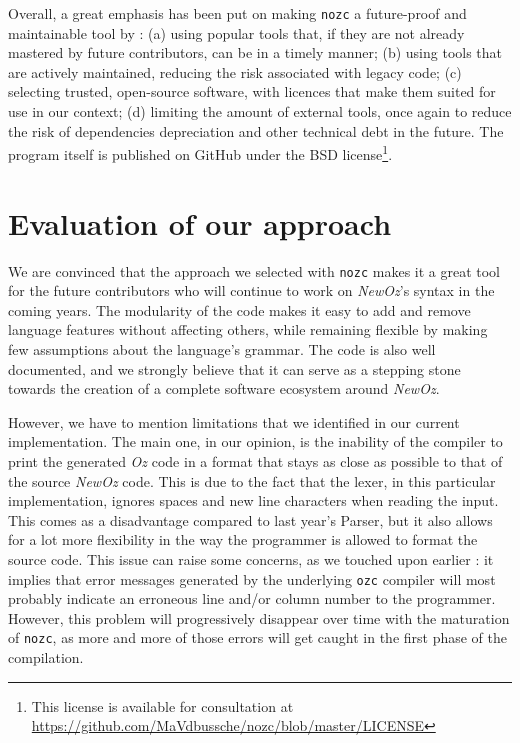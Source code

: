 Overall, a great emphasis has been put on making \texttt{nozc} a future-proof and maintainable tool by : (a) using popular tools that, if they are not already mastered by future contributors, can be in a timely manner; (b) using tools that are actively maintained, reducing the risk associated with legacy code; (c) selecting trusted, open-source software, with licences that make them suited for use in our context; (d) limiting the amount of external tools, once again to reduce the risk of dependencies depreciation and other technical debt in the future.\newline
The program itself is published on GitHub under the BSD license\footnote{This license is available for consultation at \url{https://github.com/MaVdbussche/nozc/blob/master/LICENSE}}.

\section{Evaluation of our approach}\label{sec:ch3-pros-cons}
We are convinced that the approach we selected with \texttt{nozc} makes it a great tool for the future contributors who will continue to work on \textit{NewOz}'s syntax in the coming years.
The modularity of the code makes it easy to add and remove language features without affecting others, while remaining flexible by making few assumptions about the language's grammar.
The code is also well documented, and we strongly believe that it can serve as a stepping stone towards the creation of a complete software ecosystem around \textit{NewOz}.\newline

However, we have to mention limitations that we identified in our current implementation.\newline
The main one, in our opinion, is the inability of the compiler to print the generated \textit{Oz} code in a format that stays as close as possible to that of the source \textit{NewOz} code.
This is due to the fact that the lexer, in this particular implementation, ignores spaces and new line characters when reading the input.
This comes as a disadvantage compared to last year's Parser, but it also allows for a lot more flexibility in the way the programmer is allowed to format the source code.
This issue can raise some concerns, as we touched upon earlier : it implies that error messages generated by the underlying \texttt{ozc} compiler will most probably indicate an erroneous line and/or column number to the programmer.
However, this problem will progressively disappear over time with the maturation of \texttt{nozc}, as more and more of those errors will get caught in the first phase of the compilation.\newline

